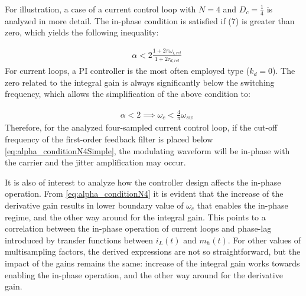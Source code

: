 \documentclass[journal]{IEEEtran}
\begin{document}
For illustration, a case of a current control loop with $N=4$ and $D_c = \frac{1}{4}$ is analyzed in more detail. The in-phase condition is satisfied if (7) is greater than zero, which yields the following inequality:

\begin{equation}
\begin{aligned}
& \alpha < 2 \frac{1+2 \pi \omega_{i,rel}}{1+2 \tau_{d,rel}}  \label{eq:alpha_conditionN4} 
\end{aligned} 
\end{equation}
\noindent
For current loops, a PI controller is the most often employed type ($k_d = 0$). The zero related to the integral gain is always significantly below the switching frequency, which allows the simplification of the above condition to:

\begin{equation}
\begin{aligned}
& \alpha < 2  \implies \omega_c < \frac{4}{\pi} \omega_{sw} \label{eq:alpha_conditionN4Simple} 
\end{aligned} 
\end{equation}
Therefore, for the analyzed four-sampled current control loop, if the cut-off frequency of the first-order feedback filter is placed below \eqref{eq:alpha_conditionN4Simple}, the modulating waveform will be in-phase with the carrier and the jitter amplification may occur.

It is also of interest to analyze how the controller design affects the in-phase operation. From \eqref{eq:alpha_conditionN4} it is evident that the increase of the derivative gain results in lower boundary value of $\omega_c$ that enables the in-phase regime, and the other way around for the integral gain. This points to a correlation between the in-phase operation of current loops and phase-lag introduced by transfer functions between $i_L(t)$ and $m_h(t)$. 
For other values of multisampling factors, the derived expressions are not so straightforward, but the impact of the gains remains the same: increase of the integral gain works towards enabling the in-phase operation, and the other way around for the derivative gain.
\end{document}
